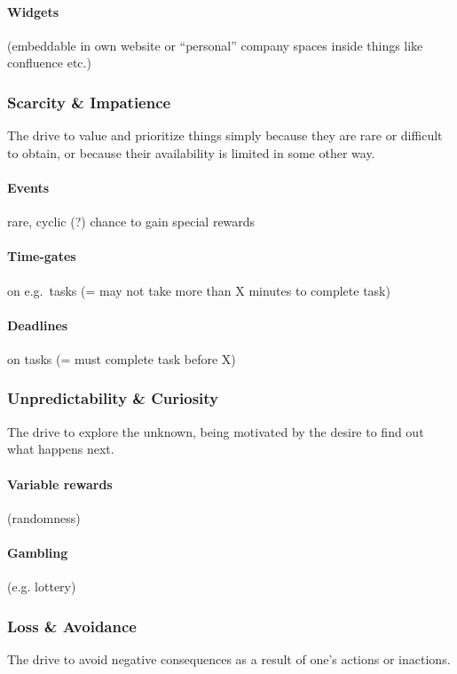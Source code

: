 \documentclass[runningheads]{llncs}
\begin{document}
\paragraph{Widgets} (embeddable in own website or \enquote{personal} company spaces inside things like confluence etc.)

\subsubsection{Scarcity \& Impatience}\cite{Chou15} The drive to value and prioritize things simply because they are rare or difficult to obtain, or because their availability is limited in some other way.

\paragraph{Events} rare, cyclic (?) chance to gain special rewards~\cite{Herz14}

\paragraph{Time-gates} on e.g.~tasks (= may not take more than X minutes to complete task)~\cite{Yongw15, DeDKN11}

\paragraph{Deadlines} on tasks (= must complete task before X)~\cite{Yongw15}

\subsubsection{Unpredictability \& Curiosity}\cite{Chou15} The drive to explore the unknown, being motivated by the desire to find out what happens next.

\paragraph{Variable rewards} (randomness)

\paragraph{Gambling} (e.g. lottery)~\cite{Yongw15}

\subsubsection{Loss \& Avoidance}\cite{Chou15} The drive to avoid negative consequences as a result of one's actions or inactions.
\end{document}
